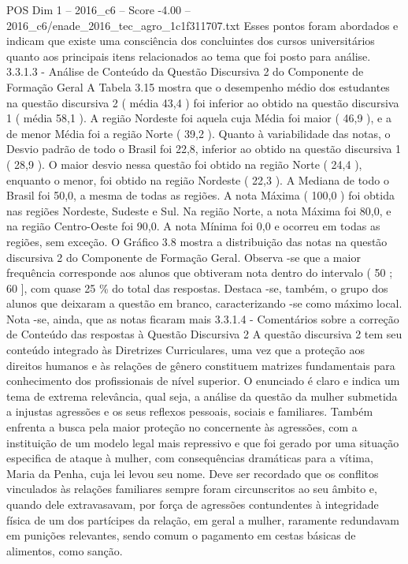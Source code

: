 \begin{textsample}{POS Dim 1 – 2016\_c6 – Score -4.00 – 2016\_c6/enade\_2016\_tec\_agro\_1c1f311707.txt}
Esses pontos foram abordados e indicam que existe uma consciência dos concluintes dos cursos universitários quanto aos principais itens relacionados ao tema que foi posto para análise. 3.3.1.3 - Análise de Conteúdo da Questão Discursiva 2 do Componente de Formação Geral A Tabela 3.15 mostra que o desempenho médio dos estudantes na questão discursiva 2 ( média 43,4 ) foi inferior ao obtido na questão discursiva 1 ( média 58,1 ).
A região Nordeste foi aquela cuja Média foi maior ( 46,9 ), e a de menor Média foi a região Norte ( 39,2 ).
Quanto à variabilidade das notas, o Desvio padrão de todo o Brasil foi 22,8, inferior ao obtido na questão discursiva 1 ( 28,9 ).
O maior desvio nessa questão foi obtido na região Norte ( 24,4 ), enquanto o menor, foi obtido na região Nordeste ( 22,3 ).
A Mediana de todo o Brasil foi 50,0, a mesma de todas as regiões.
A nota Máxima ( 100,0 ) foi obtida nas regiões Nordeste, Sudeste e Sul.
Na região Norte, a nota Máxima foi 80,0, e na região Centro-Oeste foi 90,0.
A nota Mínima foi 0,0 e ocorreu em todas as regiões, sem exceção.
O Gráfico 3.8 mostra a distribuição das notas na questão discursiva 2 do Componente de Formação Geral.
Observa -se que a maior frequência corresponde aos alunos que obtiveram nota dentro do intervalo ( 50 ; 60 ], com quase 25 \% do total das respostas.
Destaca -se, também, o grupo dos alunos que deixaram a questão em branco, caracterizando -se como máximo local.
Nota -se, ainda, que as notas ficaram mais 3.3.1.4 - Comentários sobre a correção de Conteúdo das respostas à Questão Discursiva 2 A questão discursiva 2 tem seu conteúdo integrado às Diretrizes Curriculares, uma vez que a proteção aos direitos humanos e às relações de gênero constituem matrizes fundamentais para conhecimento dos profissionais de nível superior.
O enunciado é claro e indica um tema de extrema relevância, qual seja, a análise da questão da mulher submetida a injustas agressões e os seus reflexos pessoais, sociais e familiares.
Também enfrenta a busca pela maior proteção no concernente às agressões, com a instituição de um modelo legal mais repressivo e que foi gerado por uma situação especifica de ataque à mulher, com consequências dramáticas para a vítima, Maria da Penha, cuja lei levou seu nome.
Deve ser recordado que os conflitos vinculados às relações familiares sempre foram circunscritos ao seu âmbito e, quando dele extravasavam, por força de agressões contundentes à integridade física de um dos partícipes da relação, em geral a mulher, raramente redundavam em punições relevantes, sendo comum o pagamento em cestas básicas de alimentos, como sanção.

\end{textsample}
